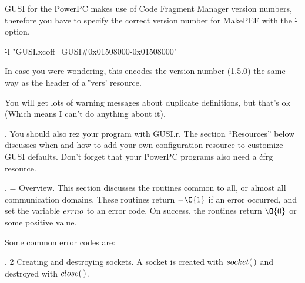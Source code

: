 \medskip \.{GUSI} for the \.{PowerPC} makes use of Code Fragment Manager
version numbers,
therefore you have to specify the correct version number for \.{MakePEF} with
the \.{-l}
option.

\medskip
\.{-l "GUSI.xcoff=GUSI\#0x01508000-0x01508000"}
\medskip

In case you were wondering, this encodes the version number (1.5.0) the same
way as the
header of a \.{'vers'} resource.

\medskip You will get lots of warning messages about duplicate definitions, but
that's ok
(Which means I can't do anything about it).

\fi

. You should also rez your program with \.{GUSI.r}. The section
``Resources'' below
discusses when and how to add your own configuration resource to customize %
\.{GUSI}
defaults. Don't forget that your \.{PowerPC} programs also need a \.{cfrg}
resource.

\fi

. = Overview. This section discusses the routines common to all, or almost
all
communication domains. These routines return \CD{}${-}\O{1}$\DC{} if an error
occurred,
and set the variable \CD{}$\\{errno}$\DC{} to an error code. On success, the
routines return \CD{}$\O{0}$\DC{}
or some positive value.

\medskip
Some common error codes are:
\medskip{}

\fi

. 2 Creating and destroying sockets. A socket is created with \CD{}$%
\\{socket}(\,)$\DC{} and destroyed
with \CD{}$\\{close}(\,)$\DC{}.

\fi

